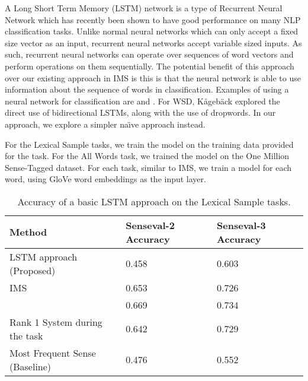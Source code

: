 A Long Short Term Memory (LSTM) network is a type of Recurrent Neural
Network which has recently been shown to have good performance on many
NLP classification tasks. Unlike normal neural networks which can only
accept a fixed size vector as an input, recurrent neural networks
accept variable sized inputs. As such, recurrent neural networks can
operate over sequences of word vectors and perform operations on them
sequentially. The potential benefit of this approach over our existing
approach in IMS is this is that the neural network is able to use
information about the sequence of words in classification. Examples of
using a neural network for classification are
\cite{socher2011parsing} and \cite{socher2013recursive}.  
For WSD, K{\aa}geb{\"a}ck \cite{kaageback2016word} explored the direct use of bidirectional LSTMs, along with the use of dropwords. In our approach, we explore a simpler
na\"{\i}ve approach instead.

For the Lexical Sample tasks, we train the model on the training data
provided for the task. For the All Words task, we trained the model on
the One Million Sense-Tagged dataset. For each task, similar to IMS,
we train a model for each word, using GloVe word embeddings as the input layer.

\begin{table}[th]
	\caption{Accuracy of a basic LSTM approach on the Lexical
          Sample tasks.}
	\label{table:NN-LS}
	\begin{center}
		\begin{tabular}{| p{6cm} | p{4cm} | p{4cm} |}
			\hline
			Method & Senseval-2 Accuracy & Senseval-3 Accuracy \\
			\hline
			LSTM approach (Proposed) & 0.458  & 0.603 \\
			\hline
			IMS & 0.653 & 0.726\\
            \hline
            \cite{kaageback2016word} & 0.669 & 0.734 \\
			\hline
			Rank 1 System during the task & 0.642 & 0.729 \\
			\hline
			Most Frequent Sense (Baseline) & 0.476 & 0.552 \\
			\hline
		\end{tabular}
	\end{center}
\end{table}

